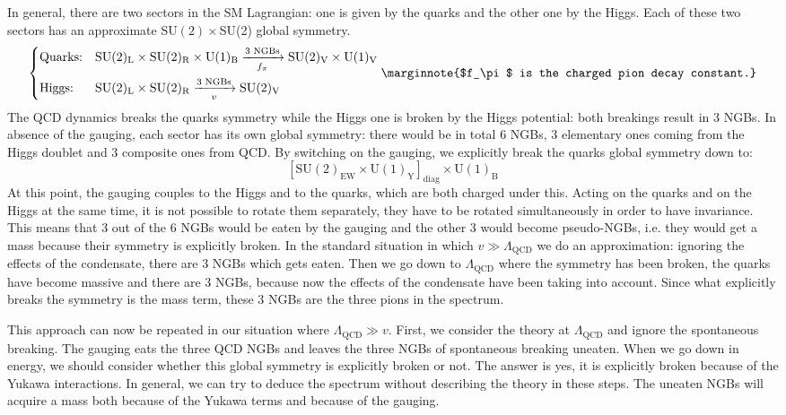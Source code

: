\documentclass[../main.tex]{subfiles}
\begin{document}
\begin{kaobox}[frametitle=The SM Situation]
In general, there are two sectors in the SM Lagrangian: one is given by the quarks and the other one by the Higgs. Each of these two sectors has an approximate SU$(2)\times$SU(2) global symmetry. 
\[
\left\{
\begin{aligned}
&\text{Quarks:}&&\text{SU}(2)_{\text{L}}\times\text{SU}(2)_{\text{R}}\times\text{U}(1)_{\text{B}}\xrightarrow[f_\pi]{\text{3 NGBs}}\text{SU}(2)_{\text{V}}\times\text{U}(1)_{\text{V}}\\
&\text{Higgs:}&&\text{SU}(2)_{\text{L}}\times\text{SU}(2)_{\text{R}}\xrightarrow[v]{\text{3 NGBs}}\text{SU}(2)_{\text{V}}
\end{aligned}
\right.
\marginnote{$f_\pi$ is the charged pion decay constant.}
\]
The QCD dynamics breaks the quarks symmetry while the Higgs one is broken by the Higgs potential: both breakings result in 3 NGBs. In absence of the gauging, each sector has its own global symmetry: there would be in total 6 NGBs, 3 elementary ones coming from the Higgs doublet and 3 composite ones from QCD. By switching on the gauging, we explicitly break the quarks global symmetry down to:
\[
\text{$[\text{SU}(2)_{\text{EW}}\times\text{U}(1)_{\text{Y}}]_{\text{diag}}\times\text{U}(1)_{\text{B}}$}
\]
At this point, the gauging couples to the Higgs and to the quarks, which are both charged under this. Acting on the quarks and on the Higgs at the same time, it is not possible to rotate them separately, they have to be rotated simultaneously in order to have invariance.\\
This means that 3 out of the 6 NGBs would be eaten by the gauging and the other 3 would become pseudo-NGBs, i.e. they would get a mass because their symmetry is explicitly broken. In the standard situation in which $v\gg\Lambda_{\text{QCD}}$ we do an approximation: ignoring the effects of the condensate, there are 3 NGBs which gets eaten. Then we go down to $\Lambda_{\text{QCD}}$ where the symmetry has been broken, the quarks have become massive and there are 3 NGBs, because now the effects of the condensate have been taking into account. Since what explicitly breaks the symmetry is the mass term, these 3 NGBs are the three pions in the spectrum.
\end{kaobox}
This approach can now be repeated in our situation where $\Lambda_{\text{QCD}}\gg v$. First, we consider the theory at $\Lambda_{\text{QCD}}$ and ignore the spontaneous breaking. The gauging eats the three QCD NGBs and leaves the three NGBs of spontaneous breaking uneaten. When we go down in energy, we should consider whether this global symmetry is explicitly broken or not. The answer is yes, it is explicitly broken because of the Yukawa interactions. In general, we can try to deduce the spectrum without describing the theory in these steps. The uneaten NGBs will acquire a mass both because of the Yukawa terms and because of the gauging.\\
\end{document}
